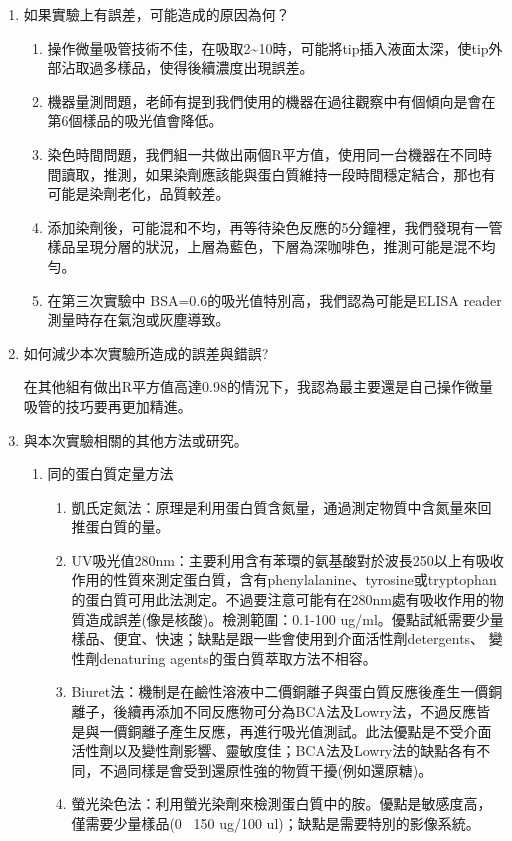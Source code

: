 \begin{enumerate}[label=\arabic*.]
  \item 如果實驗上有誤差，可能造成的原因為何？
  \begin{enumerate}[label=(\arabic*)]
    \item 操作微量吸管技術不佳，在吸取2\~{}10\mul 時，可能將tip插入液面太深，使tip外部沾取過多樣品，使得後續濃度出現誤差。
    \item 機器量測問題，老師有提到我們使用的機器在過往觀察中有個傾向是會在第6個樣品的吸光值會降低。
    \item 染色時間問題，我們組一共做出兩個R平方值，使用同一台機器在不同時間讀取，推測，如果染劑應該能與蛋白質維持一段時間穩定結合，那也有可能是染劑老化，品質較差。
    \item 添加染劑後，可能混和不均，再等待染色反應的5分鐘裡，我們發現有一管樣品呈現分層的狀況，上層為藍色，下層為深咖啡色，推測可能是混不均勻。
    \item 在第三次實驗中 BSA=0.6\mug 的吸光值特別高，我們認為可能是ELISA reader 測量時存在氣泡或灰塵導致。
  \end{enumerate}

  \item 如何減少本次實驗所造成的誤差與錯誤?

  \qquad 在其他組有做出R平方值高達0.98的情況下，我認為最主要還是自己操作微量吸管的技巧要再更加精進。
  \item 與本次實驗相關的其他方法或研究。
  \begin{enumerate}[label=(\arabic*)]
    \item 同的蛋白質定量方法 
    \begin{enumerate}[label=\alph*.]
      \item 凱氏定氮法：原理是利用蛋白質含氮量，通過測定物質中含氮量來回推蛋白質的量。
      \item UV吸光值280nm：主要利用含有苯環的氨基酸對於波長250以上有吸收作用的性質來測定蛋白質，含有phenylalanine、tyrosine或tryptophan的蛋白質可用此法測定。不過要注意可能有在280nm處有吸收作用的物質造成誤差(像是核酸)。檢測範圍：0.1-100 ug/ml。優點試紙需要少量樣品、便宜、快速；缺點是跟一些會使用到介面活性劑detergents、 變性劑denaturing agents的蛋白質萃取方法不相容。
      \item Biuret法：機制是在鹼性溶液中二價銅離子與蛋白質反應後產生一價銅離子，後續再添加不同反應物可分為BCA法及Lowry法，不過反應皆是與一價銅離子產生反應，再進行吸光值測試。此法優點是不受介面活性劑以及變性劑影響、靈敏度佳；BCA法及Lowry法的缺點各有不同，不過同樣是會受到還原性強的物質干擾(例如還原糖)。
      \item 螢光染色法：利用螢光染劑來檢測蛋白質中的胺。優點是敏感度高，僅需要少量樣品(0~ 150 ug/100 ul)；缺點是需要特別的影像系統。
    \end{enumerate}
  \end{enumerate}
  
  
  
  
  
\end{enumerate}



 

